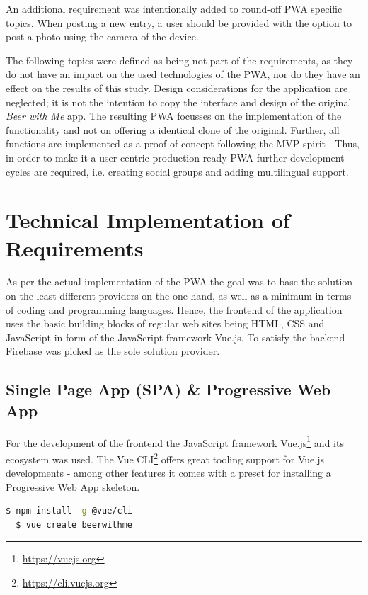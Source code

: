 An additional requirement was intentionally added to round-off PWA specific topics. When posting a new entry, a user should be provided with the option to post a photo using the camera of the device.

The following topics were defined as being not part of the requirements, as they do not have an impact on the used technologies of the PWA, nor do they have an effect on the results of this study. Design considerations for the application are neglected; it is not the intention to copy the interface and design of the original \textit{Beer with Me} app. The resulting PWA focusses on the implementation of the functionality and not on offering a identical clone of the original. Further, all functions are implemented as a proof-of-concept following the MVP spirit \citep{wikipediaMinimumViableProduct2019}. Thus, in order to make it a user centric production ready PWA further development cycles are required, i.e. creating social groups and adding multilingual support.


\section{Technical Implementation of Requirements}
As per the actual implementation of the PWA the goal was to base the solution on the least different providers on the one hand, as well as a minimum in terms of coding and programming languages. Hence, the frontend of the application uses the basic building blocks of regular web sites being HTML, CSS and JavaScript in form of the JavaScript framework Vue.js. To satisfy the backend Firebase was picked as the sole solution provider.

\subsection{Single Page App (SPA) \& Progressive Web App}
For the development of the frontend the JavaScript framework Vue.js\footnote{\url{https://vuejs.org}} and its ecosystem was used. The Vue CLI\footnote{\url{https://cli.vuejs.org}} offers great tooling support for Vue.js developments - among other features it comes with a preset for installing a Progressive Web App skeleton.

\begin{lstlisting}[language=bash, caption=Installation and project creation commands with the Vue Cli, label=lst:vue-cli]
  $ npm install -g @vue/cli
  $ vue create beerwithme
\end{lstlisting}

